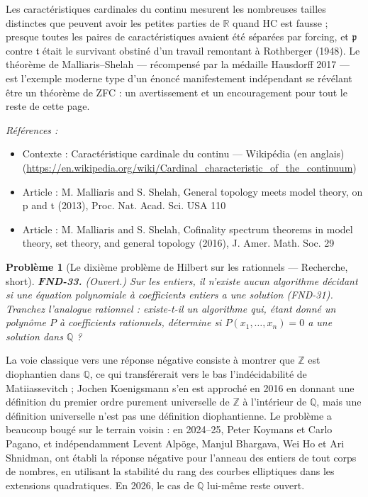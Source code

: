 \documentclass[11pt]{article}
\newtheorem{problem}{Problème}
\newenvironment{refs}{\par\small\noindent\emph{Références :}\begin{itemize}\setlength\itemsep{0pt}}{\end{itemize}\normalsize}
\begin{document}
\noindent Les caractéristiques cardinales du continu mesurent les nombreuses tailles
distinctes que peuvent avoir les \og{} petites \fg{} parties de $\mathbb{R}$ quand HC est fausse ; presque toutes les
paires de caractéristiques avaient été séparées par forcing, et $ \mathfrak{p} $ contre
$ \mathfrak{t} $ était le survivant obstiné d'un travail remontant à Rothberger (1948). Le
théorème de Malliaris--Shelah --- récompensé par la médaille Hausdorff 2017 --- est l'exemple moderne
type d'un énoncé \og{} manifestement indépendant \fg{} se révélant être un théorème de ZFC : un
avertissement et un encouragement pour tout le reste de cette page.

\begin{refs}
\item Contexte : Caractéristique cardinale du continu --- Wikipédia (en anglais) (\url{https://en.wikipedia.org/wiki/Cardinal_characteristic_of_the_continuum})
\item Article : M. Malliaris and S. Shelah, \og{} General topology meets model theory, on p and t \fg{} (2013), Proc. Nat. Acad. Sci. USA 110
\item Article : M. Malliaris and S. Shelah, \og{} Cofinality spectrum theorems in model theory, set theory, and general topology \fg{} (2016), J. Amer. Math. Soc. 29
\end{refs}

\bigskip

\begin{problem}[{Le dixième problème de Hilbert sur les rationnels --- Recherche, short}]
\textbf{FND-33.} (Ouvert.) Sur les entiers, il n'existe aucun algorithme
décidant si une équation polynomiale à coefficients entiers a une solution (FND-31). Tranchez
l'analogue rationnel : existe-t-il un algorithme qui, étant donné un polynôme $ P $ à
coefficients rationnels, détermine si $ P(x_1, \ldots, x_n) = 0 $ a une solution dans $\mathbb{Q}$ ?
\end{problem}

\noindent La voie classique vers une réponse négative consiste à montrer que $\mathbb{Z}$ est
diophantien dans $\mathbb{Q}$, ce qui transférerait vers le bas l'indécidabilité de Matiiassevitch ; Jochen
Koenigsmann s'en est approché en 2016 en donnant une définition du premier ordre purement
universelle de $\mathbb{Z}$ à l'intérieur de $\mathbb{Q}$, mais une définition universelle n'est pas une définition
diophantienne. Le problème a beaucoup bougé sur le terrain voisin : en 2024--25, Peter Koymans et
Carlo Pagano, et indépendamment Levent Alpöge, Manjul Bhargava, Wei Ho et Ari Shnidman, ont établi
la réponse négative pour l'anneau des entiers de tout corps de nombres, en utilisant la stabilité
du rang des courbes elliptiques dans les extensions quadratiques. En 2026, le cas de $\mathbb{Q}$ lui-même
reste ouvert.
\end{document}

